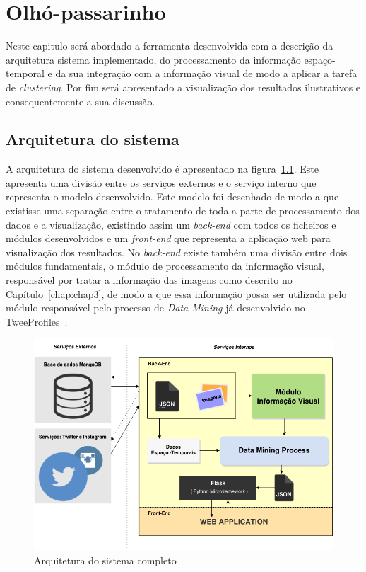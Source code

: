 \chapter{Olhó-passarinho}\label{chap:chap4}

Neste capitulo será abordado a ferramenta desenvolvida com a descrição da arquitetura sistema implementado, do processamento da informação espaço-temporal e da sua integração com a informação visual de modo a aplicar a tarefa de \textit{clustering}. Por fim será apresentado a visualização dos resultados ilustrativos e consequentemente a sua discussão. 

\section{Arquitetura do sistema}

A arquitetura do sistema desenvolvido é apresentado na figura~\ref{fig:archsys}. Este apresenta uma divisão entre os serviços externos e o serviço interno que representa o modelo desenvolvido. Este modelo foi desenhado de modo a que existisse uma separação entre o tratamento de toda a parte de processamento dos dados e a visualização, existindo assim um \textit{back-end} com todos os ficheiros e módulos desenvolvidos e um \textit{front-end} que representa a aplicação web para visualização dos resultados. No \textit{back-end} existe também uma divisão entre dois módulos fundamentais, o módulo de processamento da informação visual, responsável por tratar a informação das imagens como descrito no Capítulo~\ref{chap:chap3}, de modo a que essa informação possa ser utilizada pelo módulo responsável pelo processo de \textit{Data Mining} já desenvolvido no TweeProfiles~\cite{Cunha2013}. 

\begin{figure}
\centering
\includegraphics[width=1.0\linewidth]{./figures/arquitetura_sistema}
\caption{Arquitetura do sistema completo}
\label{fig:archsys}
\end{figure}




